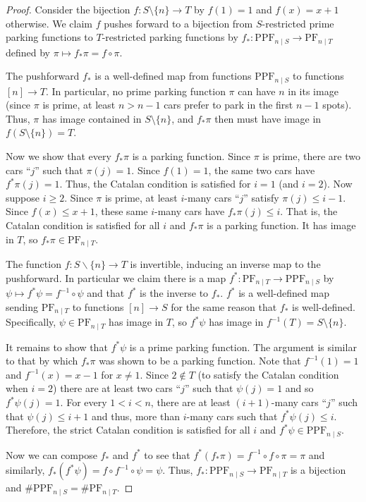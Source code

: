 \documentclass[12pt]{article}
\begin{document}
\begin{proof}
	Consider the bijection $f \colon S \setminus \{ n \} \to T$ by $f(1) = 1$ and $f(x) = x + 1$ otherwise. We claim $f$ pushes forward to a bijection from $S$-restricted prime parking functions to $T$-restricted parking functions by $f_{*}\colon\mathrm{PPF}_{n \mid S}\to\mathrm{PF}_{n \mid T}$ defined by $\pi \mapsto f_{*} \pi = f \circ \pi$.

	The pushforward $f_*$ is a well-defined map from functions $\mathrm{PPF}_{n \mid S}$ to functions $[n]\to T$. In particular, no prime parking function $\pi$ can have $n$ in its image (since $\pi$ is prime, at least $n > n - 1$ cars prefer to park in the first $n - 1$ spots). Thus, $\pi$ has image contained in $S \setminus \{ n \}$, and $f_{*} \pi$ then must have image in $f(S \setminus \{ n \}) = T$. 

	Now we show that every $f_{*} \pi$ is a parking function. Since $\pi$ is prime, there are two cars ``$j$'' such that $\pi(j) = 1$. Since $f(1) = 1$, the same two cars have $f^{*} \pi(j) = 1$. Thus, the Catalan condition is satisfied for $i = 1$ (and $i = 2$). Now suppose $i \ge 2$. Since $\pi$ is prime, at least $i$-many cars ``$j$'' satisfy $\pi(j) \le i - 1$. Since $f(x) \le x + 1$, these same $i$-many cars have $f_{*} \pi(j)\le i$. That is, the Catalan condition is satisfied for all $i$ and $f_{*} \pi$ is a parking function. It has image in $T$, so $f_{*} \pi \in \mathrm{PF}_{n\mid T}$.

	The function $f\colon S\backslash\{n\}\to T$ is invertible, inducing an inverse map to the pushforward. In particular we claim there is a map $f^{*} : \mathrm{PF}_{n \mid T} \to \mathrm{PPF}_{n \mid S}$ by $\psi \mapsto f^{*} \psi = f^{-1} \circ \psi$ and that $f^{*}$ is the inverse to $f_{*}$. $f^{*}$ is a well-defined map sending $\mathrm{PF}_{n \mid T}$ to functions $[n] \to S$ for the same reason that $f_{*}$ is well-defined. Specifically, $\psi \in \mathrm{PF}_{n \mid T}$ has image in $T$, so $f^{*} \psi$ has image in $f^{-1}(T) = S \setminus \{ n \}$. 

	It remains to show that $f^{*} \psi$ is a prime parking function. The argument is similar to that by which $f_{*} \pi$ was shown to be a parking function. Note that $f^{-1}(1) = 1$ and $f^{-1}(x) = x - 1$ for $x \neq 1$. Since $2 \not \in T$ (to satisfy the Catalan condition when $i = 2$) there are at least two cars ``$j$'' such that $\psi(j) = 1$ and so $f^{*} \psi(j) = 1$. For every $1 < i < n$, there are at least $(i + 1)$-many cars ``$j$'' such that $\psi(j) \le i + 1$ and thus, more than $i$-many cars such that $f^{*}\psi(j) \le i$. Therefore, the strict Catalan condition is satisfied for all $i$ and $f^{*} \psi \in \mathrm{PPF}_{n\mid S}$.

	Now we can compose $f_{*}$ and $f^{*}$ to see that $f^{*}(f_{*} \pi) = f^{-1} \circ f \circ \pi = \pi$ and similarly, $f_{*}(f^{*} \psi) = f \circ f^{-1} \circ \psi = \psi$. Thus, $f_*:\mathrm{PPF}_{n\mid S}\to\mathrm{PF}_{n\mid T}$ is a bijection and $\# \mathrm{PPF}_{n \mid S} = \# \mathrm{PF}_{n \mid T}$.
\end{proof}
\end{document}
